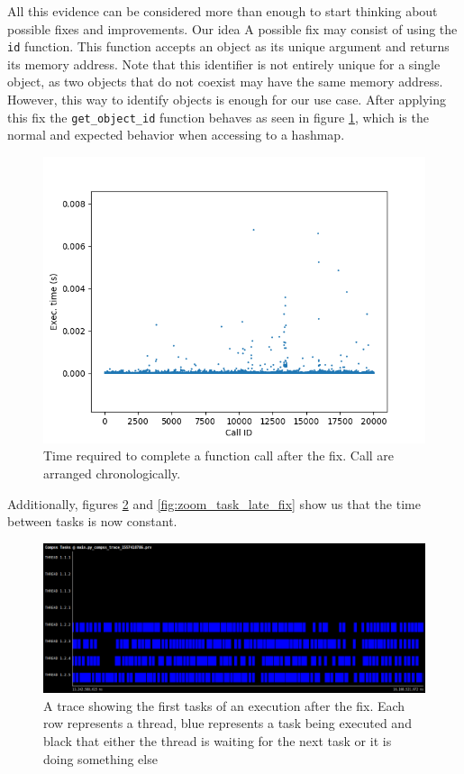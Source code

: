 All this evidence can be considered more than enough to start thinking about possible fixes and improvements. Our idea 
A possible fix may consist of using the \verb|id| function. This function accepts an object as its unique argument and returns its memory address. Note that this identifier is not entirely unique for a single object, as two objects that do not coexist may have the same memory address. However, this way to identify objects is enough for our use case. After applying this fix the \verb|get_object_id| function behaves as seen in figure \ref{fig:task_overhead_exec_times_fix}, which is the normal and expected behavior when accessing to a hashmap.

\begin{figure}
\centering
\includegraphics[scale = 0.5]{figures/task_overhead_exec_times_fix.png}
\caption{Time required to complete a function call after the fix. Call are arranged chronologically.}
\label{fig:task_overhead_exec_times_fix}
\end{figure}

Additionally, figures \ref{fig:zoom_task_early_fix} and \ref{fig:zoom_task_late_fix} show us that the time between tasks is now constant.

\begin{figure}
\centering
\includegraphics[scale = 0.3]{figures/zoom_task_early_fix.png}
\caption{A trace showing the first tasks of an execution after the fix. Each row represents a thread, blue represents a task being executed and black that either the thread is waiting for the next task or it is doing something else}
\label{fig:zoom_task_early_fix}
\end{figure}

